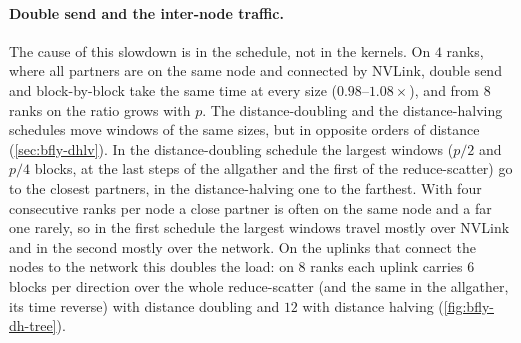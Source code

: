 \paragraph{Double send and the inter-node traffic.}
The cause of this slowdown is in the schedule, not in the kernels.
On $4$ ranks, where all partners are on the same node and connected by NVLink, double send and block-by-block take the same time at every size ($0.98$--$1.08\times$), and from $8$ ranks on the ratio grows with $p$.
The distance-doubling and the distance-halving schedules move windows of the same sizes, but in opposite orders of distance (\cref{sec:bfly-dhlv}).
In the distance-doubling schedule the largest windows ($p/2$ and $p/4$ blocks, at the last steps of the allgather and the first of the reduce-scatter) go to the closest partners, in the distance-halving one to the farthest.
With four consecutive ranks per node a close partner is often on the same node and a far one rarely, so in the first schedule the largest windows travel mostly over NVLink and in the second mostly over the network.
On the uplinks that connect the nodes to the network this doubles the load: on $8$ ranks each uplink carries $6$ blocks per direction over the whole reduce-scatter (and the same in the allgather, its time reverse) with distance doubling and $12$ with distance halving (\cref{fig:bfly-dh-tree}).

\newcommand{\dhstep}[4]{%
  \begin{tikzpicture}[x=0.5cm, y=0.62cm,
      rank/.style={circle, draw, fill=white, minimum size=0.4cm, inner sep=0pt, font=\scriptsize},
      sw/.style={rectangle, rounded corners=1.5pt, draw=black!60, fill=black!8,
                 minimum width=0.9cm, minimum height=0.3cm, inner sep=0pt},
      wire/.style={draw=black!25, line width=0.6pt},
      uplink/.style={draw=black!25, line width=1.6pt},
      path/.style={line width=#1pt, line join=round, line cap=round},
      load/.style={font=\scriptsize\bfseries, crosslink, inner sep=1pt, fill=white}]
    \foreach \i in {0,...,7} \coordinate (r\i) at (\i,0);
    \foreach \j in {0,1} \coordinate (l\j) at (4*\j+1.5,1.6);
    \coordinate (sp) at (3.5,3.2);
    \foreach \i in {0,...,7} {\pgfmathtruncatemacro{\j}{\i/4}\draw[wire] (r\i) -- (l\j);}
    \foreach \j in {0,1} \draw[uplink] (l\j) -- (sp);
    \foreach \a/\b in {#2} {
      \pgfmathtruncatemacro{\ja}{\a/4}
      \pgfmathtruncatemacro{\jb}{\b/4}
      \ifnum\ja=\jb
        \draw[path, localxfer] (r\a) -- (l\ja) -- (r\b);
      \else
        \draw[path, crosslink] (r\a) -- (l\ja) -- (sp) -- (l\jb) -- (r\b);
      \fi
    }
    \foreach \j in {0,1} \node[sw] at (l\j) {};
    \node[sw, minimum width=1.2cm] at (sp) {};
    \foreach \i in {0,...,7} \node[rank] at (r\i) {\i};
    \def\dhld{#3}\ifx\dhld\empty\else\foreach \j in {0,1} \node[load] at ($(l\j)!0.45!(sp)$) {#3};\fi
    \node[font=\scriptsize, anchor=north] at (3.5,-0.3) {#4};
  \end{tikzpicture}%
}

